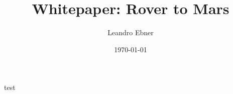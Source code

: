 \documentclass[type=bachelor,twoside,BCOR=1cm]{rwuthesis}
\title{Whitepaper: Rover to Mars}
\author{Leandro Ebner}
\date{\today}
\begin{document}
\maketitle
\tableofcontents

test
\end{document}
